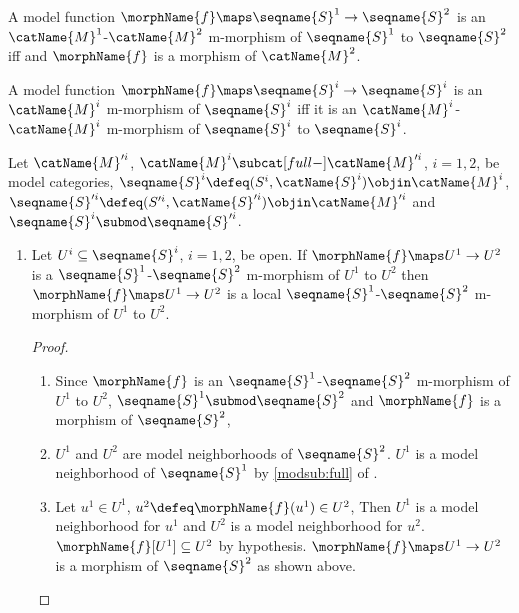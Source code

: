 \documentclass{article}
\begin{document}
\begin{definition}[M-morphisms]
A model function $\morphName{f} \maps \seqname{S}^1 \to \seqname{S}^2$ is
an $\catName{M}^1$-$\catName{M}^2$ m-morphism of $\seqname{S}^1$ to
$\seqname{S}^2$ iff
 and
$\morphName{f}$ is a morphism of
$\catName{M}^2$.\footnotemark[\value{fn:nonmodel}]

A model function $\morphName{f} \maps \seqname{S}^i \to \seqname{S}^i$ is
an $\catName{M}^i$ m-morphism of $\seqname{S}^i$ iff it is an
$\catName{M}^i$-$\catName{M}^i$ m-morphism of $\seqname{S}^i$ to
$\seqname{S}^i$.
\end{definition}

\begin{lemma}
\label{lem:modMmorph}
Let $\catName{M}'^i$, $\catName{M}^i \subcat[full-] \catName{M}'^i$,
$i=1,2$, be model categories,
$\seqname{S}^i \defeq (S^i, \catName{S}^i) \objin \catName{M}^i$,
$\seqname{S}'^i \defeq (S'^i, \catName{S}'^i) \objin \catName{M}'^i$
and $\seqname{S}^i \submod \seqname{S}'^i$.

\begin{enumerate}
\item
\label{M-morph:openmorphislocal}
Let $U^i \subseteq \seqname{S}^i$, $i=1,2$, be open.  If
$\morphName{f} \maps U^1 \to U^2$ is a
$\seqname{S}^1$-$\seqname{S}^2$ m-morphism of $U^1$ to $U^2$ then
$\morphName{f} \maps U^1 \to U^2$ is a local
$\seqname{S}^1$-$\seqname{S}^2$ m-morphism of $U^1$ to $U^2$.

\begin{proof}
\leavevmode
\begin{enumerate}
\item
Since $\morphName{f}$ is an $\seqname{S}^1$-$\seqname{S}^2$ m-morphism of
$U^1$ to $U^2$, $\seqname{S}^1 \submod \seqname{S}^2$ and
$\morphName{f}$ is a morphism of $\seqname{S}^2$,

\item
$U^1$ and $U^2$ are model neighborhoods of $\seqname{S}^2$. $U^1$ is a
model neighborhood of $\seqname{S}^1$ by \cref{modsub:full} of
{
  \showlabelsinline
  .
}

\item
Let $u^1 \in U^1$, $u^2 \defeq \morphName{f}(u^1) \in U^2$, Then $U^1$ is
a model neighborhood for $u^1$ and $U^2$ is a model neighborhood for
$u^2$.  $\morphName{f}[U^1] \subseteq U^2$ by hypothesis.
$\morphName{f} \maps U^1 \to U^2$ is a morphism of $\seqname{S}^2$ as
shown above.
\end{enumerate}
\end{proof}


\end{enumerate}
\end{lemma}
\end{document}
